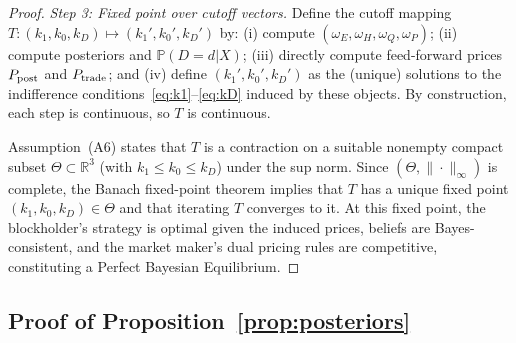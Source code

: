 \documentclass[11pt]{article}
\newcommand{\PP}{\mathbb{P}}
\newcommand{\1}{\mathbf{1}}
\newcommand{\R}{\mathbb{R}}
\begin{document}
\begin{proof}
\textit{Step 3: Fixed point over cutoff vectors.}
Define the cutoff mapping $T:(k_1,k_0,k_D)\mapsto(k_1',k_0',k_D')$ by: (i) compute $(\omega_E,\omega_H,\omega_Q,\omega_P)$; (ii) compute posteriors and $\PP(D=d|X)$; (iii) directly compute feed-forward prices $P_{\textup{post}}$ and $P_{\textup{trade}}$; and (iv) define $(k_1',k_0',k_D')$ as the (unique) solutions to the indifference conditions~\eqref{eq:k1}--\eqref{eq:kD} induced by these objects. By construction, each step is continuous, so $T$ is continuous.

Assumption~\textup{(A6)} states that $T$ is a contraction on a suitable nonempty compact subset $\Theta\subset\R^3$ (with $k_1\le k_0\le k_D$) under the sup norm. Since $(\Theta,\|\cdot\|_\infty)$ is complete, the Banach fixed-point theorem implies that $T$ has a unique fixed point $(k_1,k_0,k_D)\in\Theta$ and that iterating $T$ converges to it. At this fixed point, the blockholder's strategy is optimal given the induced prices, beliefs are Bayes-consistent, and the market maker's dual pricing rules are competitive, constituting a Perfect Bayesian Equilibrium.
\end{proof}

\subsection{Proof of Proposition~\ref{prop:posteriors}}
\label{app:proof-posteriors}
\end{document}

